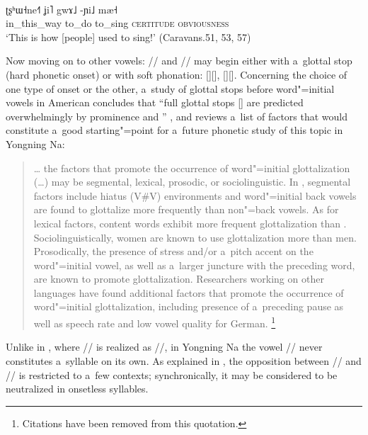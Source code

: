 \begin{exe}
	\ex
	\label{ex:thisishowtheyusedtosingGOOD}
	\\
	\gll ʈʂʰɯ˧ne˧˥ 		ʝi˥		gwɤ˩ -ɲi˩ mæ˧\\
	in\_this\_way to\_do		to\_sing \textsc{certitude} \textsc{obviousness}\\
	\glt ‘This is how [people] used to sing!’ (Caravans.51, 53, 57)
\end{exe}

			Now moving on to other vowels: // and // may begin either with a~glottal stop (hard phonetic onset) or with soft phonation:
			[]{\kern2pt}[], []{\kern2pt}[]. Concerning the choice of one type of onset or the other, a~study of glottal stops before word"=initial vowels in American  concludes that “full glottal stops [] are predicted overwhelmingly by prominence and ” \citep[20]{garellek2012}, and reviews a~list of factors that would constitute a~good starting"=point for a~future phonetic study of this topic in Yongning Na:
			
			\begin{quotation}
				{\dots} the factors that promote the occurrence of word"=initial glottalization ({\dots}) may be segmental, lexical, prosodic, or sociolinguistic. In , segmental factors include hiatus (V\#V) environments and word"=initial back vowels are found to glottalize more frequently than non"=back vowels. As for lexical factors, content words exhibit more frequent glottalization than . Sociolinguistically, women are known to use glottalization more than men. Prosodically, the presence of stress and/or a~pitch accent on the word"=initial vowel, as well as a~larger {juncture} with the preceding word, are known to promote glottalization. Researchers working on other languages have found additional factors that promote the occurrence of word"=initial glottalization, including presence of a~preceding pause as well as speech rate and low vowel quality for German. \citep[1-2]{garellek2012}\footnote{Citations have been removed from this quotation.}
			\end{quotation}
			
			Unlike in , where // is realized as //, in Yongning Na the vowel // never
			constitutes a~syllable on its own. As explained in , the
			opposition between // and // is restricted to a~few contexts; synchronically, it may
			be considered to be neutralized in onsetless syllables.
			
